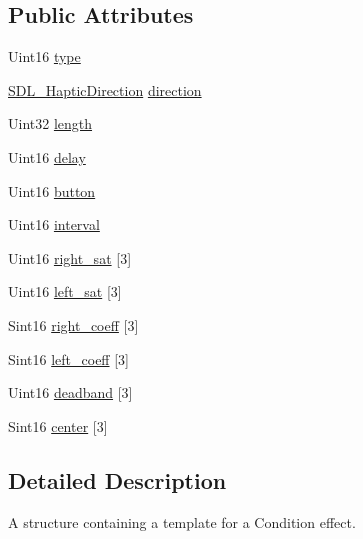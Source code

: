 \subsection*{Public Attributes}
\begin{DoxyCompactItemize}
\item 
Uint16 \hyperlink{structSDL__HapticCondition_a7be55a9a86c05dd1a54a3006781cfa6f}{type}
\item 
\hyperlink{structSDL__HapticDirection}{S\+D\+L\+\_\+\+Haptic\+Direction} \hyperlink{structSDL__HapticCondition_a728507d30d18998949313de3a25e5581}{direction}
\item 
Uint32 \hyperlink{structSDL__HapticCondition_ad0efb0a6ddc20f058e87199eaaa95978}{length}
\item 
Uint16 \hyperlink{structSDL__HapticCondition_aad40417980530ca8d80c62ba864a090b}{delay}
\item 
Uint16 \hyperlink{structSDL__HapticCondition_acd35a9d432ad122bf7824b16974eac7a}{button}
\item 
Uint16 \hyperlink{structSDL__HapticCondition_aafc182abea1078bed7e9cf5d0e713ea2}{interval}
\item 
Uint16 \hyperlink{structSDL__HapticCondition_a90427a1e0d464b4b53abc1d419c97b2e}{right\+\_\+sat} \mbox{[}3\mbox{]}
\item 
Uint16 \hyperlink{structSDL__HapticCondition_a953448774c40818a4f47c6efea21124d}{left\+\_\+sat} \mbox{[}3\mbox{]}
\item 
Sint16 \hyperlink{structSDL__HapticCondition_a3de7f164ef88841255535387d0f100b6}{right\+\_\+coeff} \mbox{[}3\mbox{]}
\item 
Sint16 \hyperlink{structSDL__HapticCondition_a2adf52c32f60f0b6826b1e3add2eae7a}{left\+\_\+coeff} \mbox{[}3\mbox{]}
\item 
Uint16 \hyperlink{structSDL__HapticCondition_af684c8eeeb719739a32723c00c5a2bbd}{deadband} \mbox{[}3\mbox{]}
\item 
Sint16 \hyperlink{structSDL__HapticCondition_a8a71ec28ff5ab85246cbc59736aa2c53}{center} \mbox{[}3\mbox{]}
\end{DoxyCompactItemize}


\subsection{Detailed Description}
A structure containing a template for a Condition effect. 

